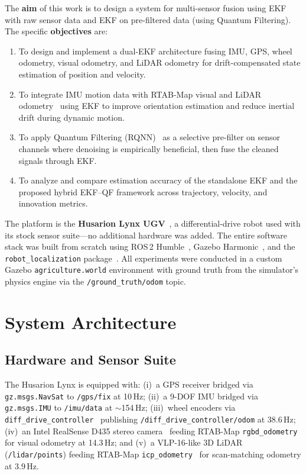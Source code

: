 \documentclass[conference]{IEEEtran}
\begin{document}
The \textbf{aim} of this work is to design a system for multi-sensor fusion using
EKF with raw sensor data and EKF on pre-filtered data (using Quantum Filtering).
The specific \textbf{objectives} are:
\begin{enumerate}
\item To design and implement a dual-EKF architecture fusing IMU, GPS, wheel
      odometry, visual odometry, and LiDAR odometry for drift-compensated state
      estimation of position and velocity.
\item To integrate IMU motion data with RTAB-Map visual and LiDAR
      odometry~\cite{forster2017,song2015} using EKF to improve orientation
      estimation and reduce inertial drift during dynamic motion.
\item To apply Quantum Filtering (RQNN)~\cite{gandhi2014} as a selective pre-filter
      on sensor channels where denoising is empirically beneficial, then fuse the
      cleaned signals through EKF.
\item To analyze and compare estimation accuracy of the standalone EKF and the
      proposed hybrid EKF--QF framework across trajectory, velocity, and innovation
      metrics.
\end{enumerate}

The platform is the \textbf{Husarion Lynx UGV}~\cite{husarion}, a differential-drive
robot used with its stock sensor suite---no additional hardware was added. The entire
software stack was built from scratch using ROS\,2 Humble~\cite{ros2}, Gazebo
Harmonic~\cite{gazebo}, and the \texttt{robot\_localization}
package~\cite{robotlocalization}. All experiments were
conducted in a custom Gazebo \texttt{agriculture.world} environment with ground
truth from the simulator's physics engine via the \texttt{/ground\_truth/odom}
topic.

\section{System Architecture}

\subsection{Hardware and Sensor Suite}

The Husarion Lynx is equipped with: (i)~a GPS receiver bridged via
\texttt{gz.msgs.NavSat} to \texttt{/gps/fix} at 10\,Hz; (ii)~a 9-DOF IMU bridged
via \texttt{gz.msgs.IMU} to \texttt{/imu/data} at $\sim$154\,Hz; (iii)~wheel
encoders via \texttt{diff\_drive\_controller}~\cite{ros2control} publishing
\texttt{/diff\_drive\_controller/odom} at 38.6\,Hz; (iv)~an Intel RealSense D435
stereo camera~\cite{realsense} feeding RTAB-Map \texttt{rgbd\_odometry} for visual odometry at
14.3\,Hz; and (v)~a VLP-16-like 3D LiDAR (\texttt{/lidar/points}) feeding
RTAB-Map \texttt{icp\_odometry}~\cite{rtabmap} for scan-matching odometry at
3.9\,Hz.
\end{document}

